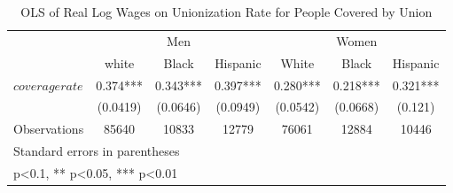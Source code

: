\begin{table}[htbp]\centering
\def\sym#1{\ifmmode^{#1}\else\(^{#1}\)\fi}
\caption{OLS of Real Log Wages on Unionization Rate for People Covered by Union}
\begin{tabular}{l*{6}{c}}
\hline\hline
                    &\multicolumn{3}{c}{Men}                        &\multicolumn{3}{c}{Women}                      \\\cmidrule(lr){2-4}\cmidrule(lr){5-7}
                    &\multicolumn{1}{c}{white}&\multicolumn{1}{c}{Black}&\multicolumn{1}{c}{Hispanic}&\multicolumn{1}{c}{White}&\multicolumn{1}{c}{Black}&\multicolumn{1}{c}{Hispanic}\\
\hline
$ coveragerate $    &       0.374***&       0.343***&       0.397***&       0.280***&       0.218***&       0.321***\\
                    &    (0.0419)   &    (0.0646)   &    (0.0949)   &    (0.0542)   &    (0.0668)   &     (0.121)   \\
\hline
Observations        &       85640   &       10833   &       12779   &       76061   &       12884   &       10446   \\
\hline\hline
\multicolumn{7}{l}{\footnotesize Standard errors in parentheses}\\
\multicolumn{7}{l}{\footnotesize * p<0.1, ** p<0.05, *** p<0.01}\\
\end{tabular}
\end{table}
